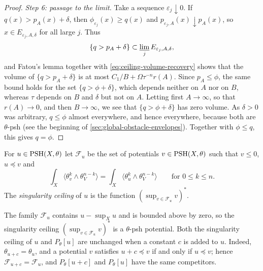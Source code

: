 \begin{proof}
\emph{Step 6: passage to the limit.} Take a sequence $\varepsilon_j\downarrow0$. If $q(x)>p_A(x)+\delta$, then $\phi_{\varepsilon_j}(x)\geq q(x)$ and $p_{\varepsilon_j,A}(x)\downarrow p_A(x)$, so $x\in E_{\varepsilon_j,A,\delta}$ for all large $j$. Thus
\[
 \{q>p_A+\delta\}\subset
                 \varliminf_j E_{\varepsilon_j,A,\delta},
\]
and Fatou's lemma together with \eqref{eq:ceiling-volume-recovery} shows that the volume of $\{q>p_A+\delta\}$ is at most $C_1/B+\Omega\tau^{-n}r(A)$. Since $p_A\leq\phi$, the same bound holds for the set $\{q>\phi+\delta\}$, which depends neither on $A$ nor on $B$, whereas $\tau$ depends on $B$ and $\delta$ but not on $A$. Letting first $A\to\infty$, so that $r(A)\to0$, and then $B\to\infty$, we see that $\{q>\phi+\delta\}$ has zero volume. As $\delta>0$ was arbitrary, $q\leq\phi$ almost everywhere, and hence everywhere, because both are $\theta$-psh (see the beginning of \cref{sec:global-obstacle-envelopes}). Together with $\phi\leq q$, this gives $q=\phi$.
\end{proof}

\begin{definition}\label{def:singularity-ceiling}
For $u\in\mathrm{PSH}(X,\theta)$ let $\mathcal F_u$ be the set of potentials $v\in\mathrm{PSH}(X,\theta)$ such that $v\leq0$, $u\preceq v$ and
\[
 \int_X\langle\theta_v^k\wedge\theta_V^{n-k}\rangle
       =\int_X\langle\theta_u^k\wedge\theta_V^{n-k}\rangle
                         \qquad\text{for }0\leq k\leq n.
\]
The \emph{singularity ceiling} of $u$ is the function $(\sup_{v\in\mathcal F_u}v)^*$.
\end{definition}
The family $\mathcal F_u$ contains $u-\sup_Xu$ and is bounded above by zero, so the singularity ceiling $(\sup_{v\in\mathcal F_u}v)^*$ is a $\theta$-psh potential. Both the singularity ceiling of $u$ and $P_\theta[u]$ are unchanged when a constant $c$ is added to $u$. Indeed, $\theta_{u+c}=\theta_u$, and a potential $v$ satisfies $u+c\preceq v$ if and only if $u\preceq v$; hence $\mathcal F_{u+c}=\mathcal F_u$, and $P_\theta[u+c]$ and $P_\theta[u]$ have the same competitors.

